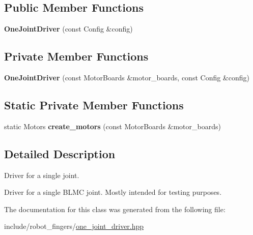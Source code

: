 \subsection*{Public Member Functions}
\begin{DoxyCompactItemize}
\item 
\mbox{\label{classrobot__fingers_1_1OneJointDriver_ac730c5dd015fa448037892967126d144}} 
{\bfseries One\+Joint\+Driver} (const Config \&config)
\end{DoxyCompactItemize}
\subsection*{Private Member Functions}
\begin{DoxyCompactItemize}
\item 
\mbox{\label{classrobot__fingers_1_1OneJointDriver_ad819a720c48af4020b5b88aea54e872f}} 
{\bfseries One\+Joint\+Driver} (const Motor\+Boards \&motor\+\_\+boards, const Config \&config)
\end{DoxyCompactItemize}
\subsection*{Static Private Member Functions}
\begin{DoxyCompactItemize}
\item 
\mbox{\label{classrobot__fingers_1_1OneJointDriver_ac16ac0401586eb37920c3cccd5b5e872}} 
static Motors {\bfseries create\+\_\+motors} (const Motor\+Boards \&motor\+\_\+boards)
\end{DoxyCompactItemize}


\subsection{Detailed Description}
Driver for a single joint. 

Driver for a single B\+L\+MC joint. Mostly intended for testing purposes. 

The documentation for this class was generated from the following file\+:\begin{DoxyCompactItemize}
\item 
include/robot\+\_\+fingers/\hyperlink{one__joint__driver_8hpp}{one\+\_\+joint\+\_\+driver.\+hpp}\end{DoxyCompactItemize}
